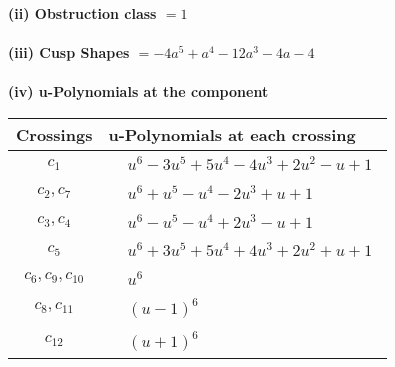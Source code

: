 \documentclass[1p]{elsarticle_modified}
\theoremstyle{definition}
\begin{document}
\flushleft \textbf{(ii) Obstruction class $= 1$}\\~\\
\flushleft \textbf{(iii) Cusp Shapes $= -4 a^5+a^4-12 a^3-4 a-4$}\\~\\
\newpage\renewcommand{\arraystretch}{1}
\flushleft \textbf{(iv) u-Polynomials at the component}\newline \\
\begin{tabular}{m{50pt}|m{274pt}}
Crossings & \hspace{64pt}u-Polynomials at each crossing \\
\hline $$\begin{aligned}c_{1}\end{aligned}$$&$\begin{aligned}
&u^6-3 u^5+5 u^4-4 u^3+2 u^2- u+1
\end{aligned}$\\
\hline $$\begin{aligned}c_{2},c_{7}\end{aligned}$$&$\begin{aligned}
&u^6+u^5- u^4-2 u^3+u+1
\end{aligned}$\\
\hline $$\begin{aligned}c_{3},c_{4}\end{aligned}$$&$\begin{aligned}
&u^6- u^5- u^4+2 u^3- u+1
\end{aligned}$\\
\hline $$\begin{aligned}c_{5}\end{aligned}$$&$\begin{aligned}
&u^6+3 u^5+5 u^4+4 u^3+2 u^2+u+1
\end{aligned}$\\
\hline $$\begin{aligned}c_{6},c_{9},c_{10}\end{aligned}$$&$\begin{aligned}
&u^6
\end{aligned}$\\
\hline $$\begin{aligned}c_{8},c_{11}\end{aligned}$$&$\begin{aligned}
&(u-1)^6
\end{aligned}$\\
\hline $$\begin{aligned}c_{12}\end{aligned}$$&$\begin{aligned}
&(u+1)^6
\end{aligned}$\\
\hline
\end{tabular}\\~\\
\end{document}
